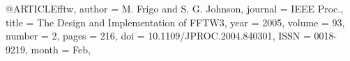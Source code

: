 
@ARTICLE{fftw,
   author = {M. {Frigo} and S. G. {Johnson}},
  journal = {IEEE Proc.},
    title = {The Design and Implementation of FFTW3},
     year = {2005},
   volume = {93},
   number = {2},
    pages = {216},
      doi = {10.1109/JPROC.2004.840301},
     ISSN = {0018-9219},
    month = {Feb},
}
